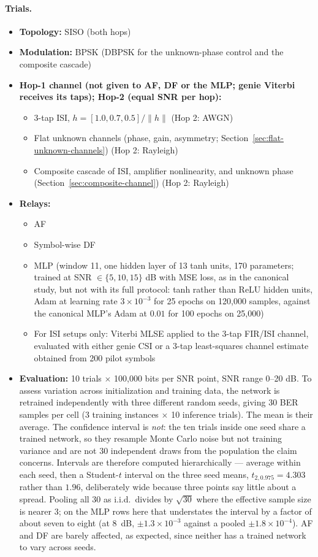 \paragraph{\textbf{Trials.}}
\begin{itemize}
 \item \textbf{Topology:} SISO (both hops)
    \item \textbf{Modulation:} BPSK (DBPSK for the unknown-phase control and the composite cascade)
    \item \textbf{Hop-1 channel (not given to AF, DF or the MLP; genie Viterbi receives its taps); Hop-2 (equal SNR per hop):}
    \begin{itemize}
        \item 3-tap ISI, $h=[1.0,0.7,0.5]/\lVert h\rVert$ (Hop 2: AWGN)
        \item Flat unknown channels (phase, gain, asymmetry; Section~\ref{sec:flat-unknown-channels}) (Hop 2: Rayleigh)
        \item Composite cascade of ISI, amplifier nonlinearity, and unknown phase (Section~\ref{sec:composite-channel}) (Hop 2: Rayleigh)
    \end{itemize}
    \item \textbf{Relays:}
    \begin{itemize}
        \item AF
        \item Symbol-wise DF
        \item MLP (window 11, one hidden layer of 13 tanh units, 170 parameters; trained at SNR $\in\{5,10,15\}$ dB with MSE loss, as in the canonical study, but not with its full protocol: tanh rather than ReLU hidden units, Adam at learning rate $3\times10^{-3}$ for 25 epochs on 120{,}000 samples, against the canonical MLP's Adam at $0.01$ for 100 epochs on 25{,}000)
        \item For ISI setups only: Viterbi MLSE applied to the 3-tap FIR/ISI channel, evaluated with either genie CSI or a 3-tap least-squares channel estimate obtained from 200 pilot symbols
    \end{itemize}
\item \textbf{Evaluation:} 10 trials $\times$ 100{,}000 bits per SNR point, SNR range 0--20 dB. To assess variation across initialization and training data, the network is retrained independently with three different random seeds, giving 30 BER samples per cell (3 training instances $\times$ 10 inference trials). The mean is their average. The confidence interval is \emph{not}: the ten trials inside one seed share a trained network, so they resample Monte Carlo noise but not training variance and are not 30 independent draws from the population the claim concerns. Intervals are therefore computed hierarchically --- average within each seed, then a Student-$t$ interval on the three seed means, $t_{2,0.975} = 4.303$ rather than $1.96$, deliberately wide because three points say little about a spread. Pooling all 30 as i.i.d.\ divides by $\sqrt{30}$ where the effective sample size is nearer 3; on the MLP rows here that understates the interval by a factor of about seven to eight (at 8~dB, ${\pm}1.3\times10^{-3}$ against a pooled ${\pm}1.8\times10^{-4}$). AF and DF are barely affected, as expected, since neither has a trained network to vary across seeds.

\end{itemize}
